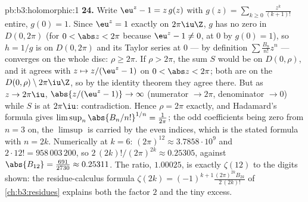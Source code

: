 \begin{solution}{pb:b3:holomorphic:1}
\textbf{24.} Write $\eu^z - 1 = z\,g(z)$ with $g(z) =
\sum_{k\geq0}\frac{z^k}{(k+1)!}$ entire, $g(0) = 1$. Since
$\eu^z = 1$ exactly on $2\pi\iu\Z$, $g$ has no zero in
$D(0, 2\pi)$ (for $0 < \abs z < 2\pi$ because $\eu^z - 1
\neq 0$, at $0$ by $g(0) = 1$), so $h = 1/g$ is 
on $D(0,2\pi)$ and its Taylor series at $0$ --- by
definition $\sum\frac{B_n}{n!}z^n$ --- converges on the
whole disc: $\rho \geq 2\pi$. If $\rho > 2\pi$, the sum $S$
would be  on $D(0,\rho)$, and it agrees with $z
\mapsto z/(\eu^z - 1)$ on $0 < \abs z < 2\pi$; both are
 on the   $D(0,\rho) \setminus
2\pi\iu\Z$, so by the identity theorem they agree there. But
as $z \to 2\pi\iu$, $\abs{z/(\eu^z - 1)} \to \infty$
(numerator $\to 2\pi$, denominator $\to 0$) while $S$ is
 at $2\pi\iu$: contradiction. Hence $\rho = 2\pi$
exactly, and Hadamard's formula gives
$\limsup_n\abs{B_n/n!}^{1/n} = \frac1{2\pi}$; the odd
coefficients being zero from $n = 3$ on, the $\limsup$ is
carried by the even indices, which is the stated formula
with $n = 2k$. Numerically at $k = 6$: $(2\pi)^{12} \approx
3.7858\cdot10^9$ and $2\cdot12! = 958\,003\,200$, so
$2\,(2k)!/(2\pi)^{2k} \approx 0.25305$, against
$\abs{B_{12}} = \frac{691}{2730} \approx 0.25311$. The
ratio, $1.00025$, is exactly $\zeta(12)$ to the digits
shown: the residue-calculus formula $\zeta(2k) =
(-1)^{k+1}\frac{(2\pi)^{2k}B_{2k}}{2\,(2k)!}$ of
\cref{ch:b3:residues} explains both the factor $2$ and the
tiny excess.


\end{solution}
